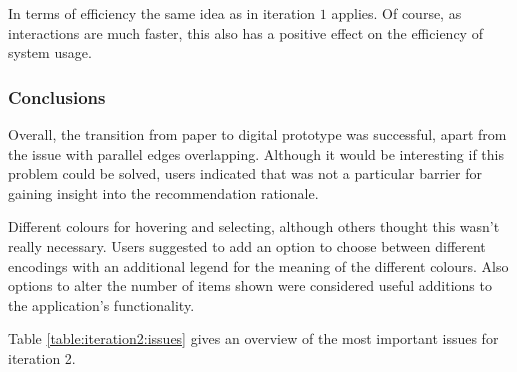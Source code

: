 In terms of efficiency the same idea as in iteration $1$ applies. Of course, as interactions are much faster, this also has a positive effect on the efficiency of system usage.


\subsubsection{Conclusions}\label{chapter:prototype:section:soundsuggest1:conclusion}


Overall, the transition from paper to digital prototype was successful, apart from the issue with parallel edges overlapping. Although it would be interesting if this problem could be solved, users indicated that was not a particular barrier for gaining insight into the recommendation rationale.

Different colours for hovering and selecting, although others thought this wasn't really necessary. Users suggested to add an option to choose between different encodings with an additional legend for the meaning of the different colours. Also options to alter the number of items shown were considered useful additions to the application's functionality.

Table \ref{table:iteration2:issues} gives an overview of the most important issues for iteration 2.


